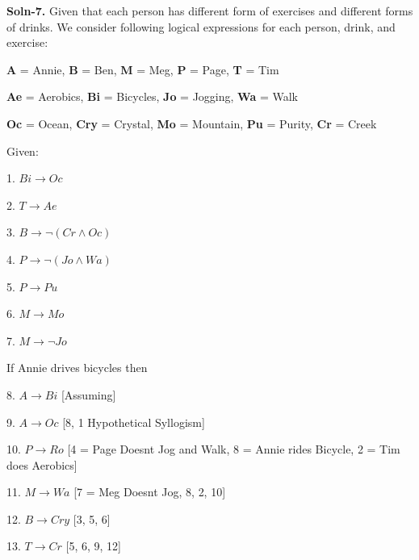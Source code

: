 \documentclass{article}
\begin{document}
\begin{enumerate}
        \textbf{Soln-7.} Given that each person has different form of exercises 
                        and different forms of drinks. We consider following logical 
                        expressions for each person, drink, and exercise: \par

                        \textbf{A} = Annie, \textbf{B} = Ben, \textbf{M} = Meg, \textbf{P} = Page, \textbf{T} = Tim \par
                        \textbf{Ae} = Aerobics, \textbf{Bi} = Bicycles, \textbf{Jo} = Jogging, \textbf{Wa} = Walk \par
                        \textbf{Oc} = Ocean, \textbf{Cry} = Crystal, \textbf{Mo} = Mountain, \textbf{Pu} = Purity, \textbf{Cr} = Creek \par

                        Given: \par
                        1. $Bi \rightarrow Oc$ \par
                        2. $T \rightarrow Ae$ \par
                        3. $B \rightarrow \neg (Cr \wedge Oc)$ \par
                        4. $P \rightarrow \neg (Jo \wedge Wa)$ \par
                        5. $P \rightarrow Pu$ \par
                        6. $M \rightarrow Mo$ \par
                        7. $M \rightarrow ¬Jo$ \par
                        If Annie drives bicycles then \par
                        8.  $A \rightarrow Bi$	[Assuming] \par
                        9.  $A \rightarrow Oc$	[8, 1 Hypothetical Syllogism] \par
                        10. $P \rightarrow Ro$	[4 = Page Doesnt Jog and Walk, 8 = Annie rides Bicycle, 2 = Tim does Aerobics] \par
                        11. $M \rightarrow Wa$	[7 = Meg Doesnt Jog, 8, 2, 10] \par
                        12. $B \rightarrow Cry$	[3, 5, 6] \par
                        13. $T \rightarrow Cr$	[5, 6, 9, 12] \par


\end{enumerate}
\end{document}
